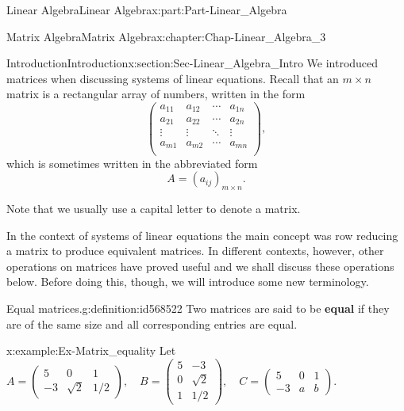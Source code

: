 \documentclass[oneside,10pt,]{book}
\newcommand{\terminology}[1]{\textbf{#1}}
\numberwithin{equation}{section}
\newcommand{\amp}{&}
\begin{document}
\begin{partptx}{Linear Algebra}{}{Linear Algebra}{}{}{x:part:Part-Linear_Algebra}
\typeout{************************************************}
%
\begin{chapterptx}{Matrix Algebra}{}{Matrix Algebra}{}{}{x:chapter:Chap-Linear_Algebra_3}
%
%
\typeout{************************************************}
\typeout{************************************************}
%
\begin{sectionptx}{Introduction}{}{Introduction}{}{}{x:section:Sec-Linear_Algebra_Intro}
We introduced matrices when discussing systems of linear equations. Recall that an \(m \times n\) matrix is a rectangular array of numbers, written in the form%
\begin{equation*}
\begin{pmatrix}
a_{11} \amp a_{12} \amp  \cdots \amp a_{1n}\\
a_{21} \amp a_{22} \amp \cdots \amp a_{2n}\\
\vdots \amp \vdots \amp \ddots \amp \vdots\\
a_{m1} \amp a_{m2} \amp \cdots \amp a_{mn}\\
\end{pmatrix},
\end{equation*}
which is sometimes written in the abbreviated form%
\begin{equation*}
A=\left(a_{ij}\right)_{m \times n}.
\end{equation*}
%
\par
Note that we usually use a capital letter to denote a matrix.%
\par
In the context of systems of linear equations the main concept was row reducing a matrix to produce equivalent matrices. In different contexts, however, other operations on matrices have proved useful and we shall discuss these operations below. Before doing this, though, we will introduce some new terminology.%
\begin{definition}{Equal matrices.}{g:definition:id568522}%
Two matrices are said to be \terminology{equal} if they are of the same size and all corresponding entries are equal.\end{definition}
\begin{example}{}{x:example:Ex-Matrix_equality}%
Let \(A = \begin{pmatrix}5 \amp 0 \amp 1\\ -3 \amp \sqrt{2} \amp 1/2\end{pmatrix}, \quad B = \begin{pmatrix}5 \amp -3 \\ 0 \amp \sqrt{2} \\ 1 \amp 1/2\end{pmatrix}, \quad C = \begin{pmatrix} 5 \amp 0 \amp 1\\ -3 \amp a \amp b\end{pmatrix}.\)%

\end{example}
\end{sectionptx}
\end{chapterptx}
\end{partptx}
\end{document}
